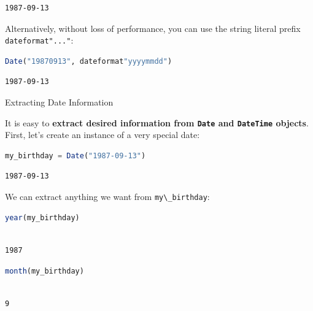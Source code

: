 \documentclass[
  notoc %
]{tufte-book}
\makeatletter
\newcommand{\passthrough}[1]{#1}
\renewcommand\subsubsection{%
\@startsection{subsubsection}{3}{\z@ }{-3.25ex\@plus -1ex \@minus -.2ex}{1.5ex \@plus .2ex}{\normalfont \normalsize \bfseries }
}
\makeatother
\begin{document}
\begin{lstlisting}[language=Output]
1987-09-13
\end{lstlisting}

Alternatively, without loss of performance, you can use the string
literal prefix \passthrough{\lstinline!dateformat"..."!}:

\begin{lstlisting}[language=Julia]
Date("19870913", dateformat"yyyymmdd")
\end{lstlisting}

\begin{lstlisting}[language=Output]
1987-09-13
\end{lstlisting}

\hypertarget{sec:dates_information}{%
\subsubsection{Extracting Date
Information}\label{sec:dates_information}}

It is easy to \textbf{extract desired information from
\passthrough{\lstinline!Date!} and \passthrough{\lstinline!DateTime!}
objects}. First, let's create an instance of a very special date:

\begin{lstlisting}[language=Julia]
my_birthday = Date("1987-09-13")
\end{lstlisting}

\begin{lstlisting}[language=Output]
1987-09-13
\end{lstlisting}

We can extract anything we want from
\passthrough{\lstinline!my\_birthday!}:

\begin{lstlisting}[language=Julia]
year(my_birthday)
\end{lstlisting}

\begin{lstlisting}[language=Output]

1987

\end{lstlisting}

\begin{lstlisting}[language=Julia]
month(my_birthday)
\end{lstlisting}

\begin{lstlisting}[language=Output]

9

\end{lstlisting}
\end{document}

